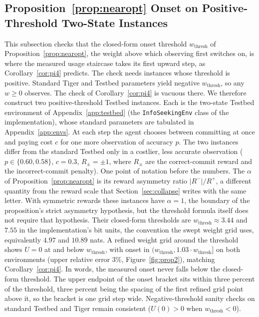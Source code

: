 \subsection{Proposition~\ref{prop:nearopt} Onset on Positive-Threshold Two-State Instances}
\label{sec:prop2exp}

This subsection checks that the closed-form onset threshold $w_{\mathrm{thresh}}$ of Proposition~\ref{prop:nearopt}, the weight above which observing first switches on, is where the measured usage staircase takes its first upward step, as Corollary~\ref{cor:pi4} predicts. The check needs instances whose threshold is positive. Standard Tiger and Testbed parameters yield negative $w_{\mathrm{thresh}}$, so any $w \ge 0$ observes. The check of Corollary~\ref{cor:pi4} is vacuous there. We therefore construct two positive-threshold Testbed instances. Each is the two-state Testbed environment of Appendix~\ref{app:testbed} (the \texttt{InfoSeekingEnv} class of the implementation), whose standard parameters are tabulated in Appendix~\ref{app:envs}. At each step the agent chooses between committing at once and paying cost $c$ for one more observation of accuracy $p$. The two instances differ from the standard Testbed only in a costlier, less accurate observation ($p \in \{0.60, 0.58\}$, $c{=}0.3$, $R_\pm = \pm 1$, where $R_\pm$ are the correct-commit reward and the incorrect-commit penalty). One point of notation before the numbers. The $\alpha$ of Proposition~\ref{prop:nearopt} is its reward asymmetry ratio $|R^-|/R^+$, a different quantity from the reward scale that Section~\ref{sec:collapse} writes with the same letter. With symmetric rewards these instances have $\alpha{=}1$, the boundary of the proposition's strict asymmetry hypothesis, but the threshold formula itself does not require that hypothesis. Their closed-form thresholds are $w_{\mathrm{thresh}} \approx 3.44$ and $7.55$ in the implementation's bit units, the convention the swept weight grid uses, equivalently $4.97$ and $10.89$ nats. A refined weight grid around the threshold shows $U{=}0$ at and below $w_{\mathrm{thresh}}$, with onset in $(w_{\mathrm{thresh}}, 1.03\cdot w_{\mathrm{thresh}}]$ on both environments (upper relative error $3\%$, Figure~\ref{fig:prop2}), matching Corollary~\ref{cor:pi4}. In words, the measured onset never falls below the closed-form threshold. The upper endpoint of the onset bracket sits within three percent of the threshold, three percent being the spacing of the first refined grid point above it, so the bracket is one grid step wide. Negative-threshold sanity checks on standard Testbed and Tiger remain consistent ($U(0) > 0$ when $w_{\mathrm{thresh}} < 0$).

